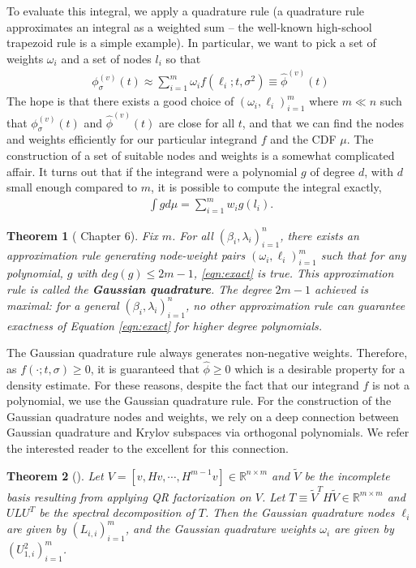 \documentclass{article}
\newtheorem{theorem}{Theorem}[section]
\newcommand{\R}{\mathbb{R}}
\newcommand{\phis}{\phi_{\sigma}}
\newcommand{\phisv}{\phis^{(v)}}
\begin{document}
To evaluate this integral, we apply a quadrature rule (a quadrature rule approximates an integral as a weighted sum -- the well-known high-school trapezoid rule is a simple example). In particular, we want to pick a set of weights $\omega_i$ and a set of nodes $l_i$ so that
\begin{align}\label{eqn:approx_form}
  \phisv(t) \approx \sum_{i=1}^m \omega_i f(\ell_i; t, \sigma^2) \equiv \widehat{\phi}^{(v)}(t)
\end{align}
The hope is that there exists a good choice of $(\omega_i, \ell_i)_{i=1}^m$ where $m \ll n$ such that $\phisv(t)$ and $\widehat{\phi}^{(v)}(t)$ are close for all $t$, and that we can find the nodes and weights efficiently for our particular integrand $f$ and the CDF $\mu$. The construction of a set of suitable nodes and weights is a somewhat complicated affair. It turns out that if the integrand were a polynomial $g$ of degree $d$, with $d$ small enough compared to $m$, it is possible to compute the integral exactly,
\begin{align}\label{eqn:exact}
    \int g d\mu = \sum_{i=1}^m w_i g(l_i).
\end{align}
\begin{theorem}[\cite{golub2009matrices} Chapter 6]\label{thm:gauss_quad_opt}
Fix $m$. For all $(\beta_i, \lambda_i)_{i=1}^n$, there exists an approximation rule generating node-weight pairs $(\omega_i, \ell_i)_{i=1}^m$ such that for any polynomial, $g$ with $deg(g) \leq 2m-1$, \eqref{eqn:exact} is true. This approximation rule is called the \textbf{Gaussian quadrature}. The degree $2m - 1$ achieved is maximal: for a general $(\beta_i, \lambda_i)_{i=1}^n$, no other approximation rule can guarantee exactness of Equation \eqref{eqn:exact} for higher degree polynomials. 
\end{theorem}

The Gaussian quadrature rule always generates non-negative weights. Therefore, as $f(\cdot; t, \sigma) \geq 0$, it is guaranteed that $\widehat{\phi} \geq 0$ which is a desirable property for a density estimate. For these reasons, despite the fact that our integrand $f$ is not a polynomial, we use the Gaussian quadrature rule. For the construction of the Gaussian quadrature nodes and weights, we rely on a deep connection between Gaussian quadrature and Krylov subspaces via orthogonal polynomials. We refer the interested reader to the excellent \cite{golub2009matrices} for this connection.
\begin{theorem}[\cite{golub1969calculation}] \label{thm:naive_computation}
Let $V = [v, Hv, \cdots, H^{m-1}v] \in \R^{n \times m}$ and $\tilde{V}$ be the incomplete basis resulting from applying QR factorization on $V$. Let $T \equiv \tilde{V}^TH\tilde{V} \in \R^{m \times m}$ and $ULU^T$ be the spectral decomposition of $T$. Then the Gaussian quadrature nodes $\ell_i$ are given by $(L_{i, i})_{i=1}^m$, and the Gaussian quadrature weights $\omega_i$ are given by $(U_{1, i}^2)_{i=1}^m$.
\end{theorem}
\end{document}
